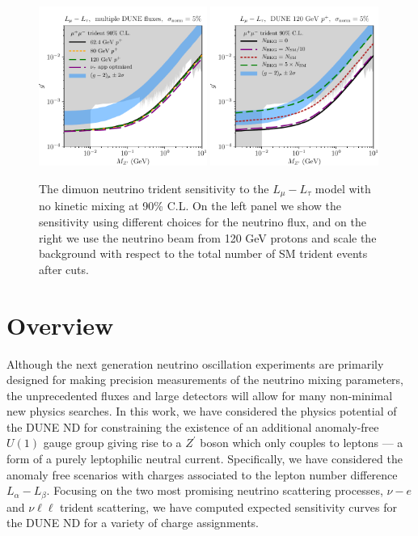 \begin{figure}[ht]
\centering
  \includegraphics[width=0.49\textwidth]{lmultau_fluxes.pdf}
 \includegraphics[width=0.49\textwidth]{lmultau_bkgs.pdf}
 \caption[DUNE sensitivity to the $L_\mu-L_\tau$ model with varied assumptions.]{The dimuon neutrino trident sensitivity to the $L_\mu - L_\tau$ model with no kinetic mixing at 90\% C.L. On the left panel we show the sensitivity using different choices for the neutrino flux, and on the right we use the neutrino beam from 120 GeV protons and scale the background with respect to the total number of SM trident events after cuts.\label{fig:Lmu_Ltau_varied}}
\end{figure}
%
\section{\label{sec:conclusion}Overview}

Although the next generation neutrino oscillation experiments are primarily designed for making precision measurements of the neutrino mixing parameters, the unprecedented fluxes and large detectors will allow for many non-minimal new physics searches. In this work, we have considered the physics potential of the DUNE ND for constraining the existence of an additional anomaly-free $U(1)$ gauge group giving rise to a $Z^\prime$ boson which only couples to leptons --- a form of a purely leptophilic neutral current. Specifically, we have considered the anomaly free scenarios with charges associated to the lepton number difference $L_\alpha-L_\beta$.  Focusing on the two most promising neutrino scattering processes, $\nu- e$ and $\nu\ell\ell$ trident scattering, we have computed expected sensitivity curves for the DUNE ND for a variety of charge assignments. 

